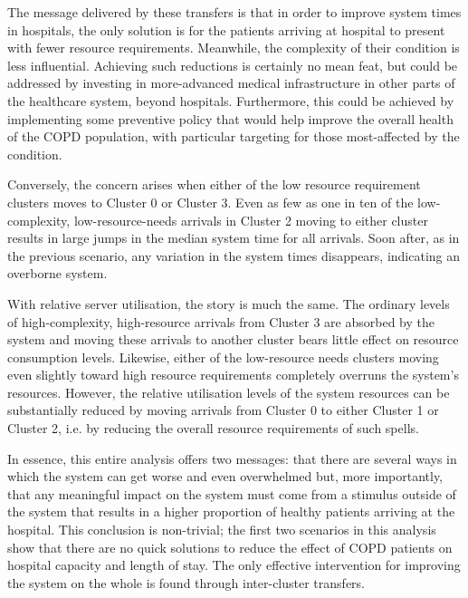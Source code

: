 \begin{table}
    \centering%
    \resizebox{\textwidth}{!}{%
        
    }
    \caption{%
        Proportional changes in median relative utilisation for selected cluster
        transfers
    }\label{tab:moving_util}
\end{table}

The message delivered by these transfers is that in order to improve system
times in hospitals, the only solution is for the patients arriving at hospital
to present with fewer resource requirements. Meanwhile, the complexity of their
condition is less influential. Achieving such reductions is certainly no mean
feat, but could be addressed by investing in more-advanced medical
infrastructure in other parts of the healthcare system, beyond hospitals.
Furthermore, this could be achieved by implementing some preventive policy that
would help improve the overall health of the COPD population, with particular
targeting for those most-affected by the condition.

Conversely, the concern arises when either of the low resource requirement
clusters moves to Cluster 0 or Cluster 3. Even as few as one in ten of the
low-complexity, low-resource-needs arrivals in Cluster 2 moving to either
cluster results in large jumps in the median system time for all arrivals. Soon
after, as in the previous scenario, any variation in the system times
disappears, indicating an overborne system.

With relative server utilisation, the story is much the same. The ordinary
levels of high-complexity, high-resource arrivals from Cluster 3 are absorbed by
the system and moving these arrivals to another cluster bears little effect on
resource consumption levels. Likewise, either of the low-resource needs clusters
moving even slightly toward high resource requirements completely overruns the
system’s resources. However, the relative utilisation levels of the system
resources can be substantially reduced by moving arrivals from Cluster 0 to
either Cluster 1 or Cluster 2, i.e. by reducing the overall resource
requirements of such spells.

In essence, this entire analysis offers two messages: that there are several
ways in which the system can get worse and even overwhelmed but, more
importantly, that any meaningful impact on the system must come from a stimulus
outside of the system that results in a higher proportion of healthy patients
arriving at the hospital. This conclusion is non-trivial; the first two
scenarios in this analysis show that there are no quick solutions to reduce the
effect of COPD patients on hospital capacity and length of stay. The only
effective intervention for improving the system on the whole is found through
inter-cluster transfers.


